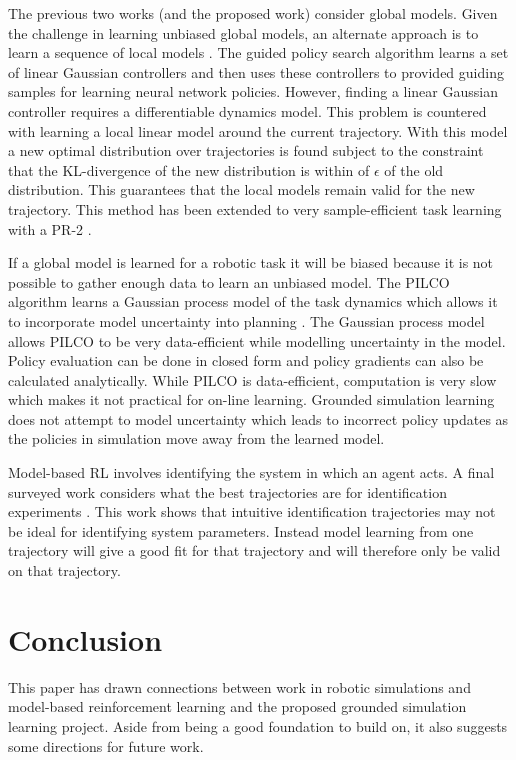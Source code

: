 \documentclass[12 pt]{article}
\begin{document}
The previous two works (and the proposed work) consider global models. Given the challenge in learning unbiased global models, an alternate approach is to learn a sequence of local models \cite{levine2014learning}. The guided policy search algorithm learns a set of linear Gaussian controllers and then uses these controllers to provided guiding samples for learning neural network policies. However, finding a linear Gaussian controller requires a differentiable dynamics model. This problem is countered with learning a local linear model around the current trajectory. With this model a new optimal  distribution over trajectories is found subject to the constraint that the KL-divergence of the new distribution is within of $\epsilon$ of the old distribution. This guarantees that the local models remain valid for the new trajectory. This method has been extended to very sample-efficient task learning with a PR-2 \cite{levine2015learning}. 

If a global model is learned for a robotic task it will be biased because it is not possible to gather enough data to learn an unbiased model. The PILCO algorithm learns a Gaussian process model of the task dynamics which allows it to incorporate model uncertainty into planning \cite{deisenroth2011pilco}. The Gaussian process model allows PILCO to be very data-efficient while modelling uncertainty in the model. Policy evaluation can be done in closed form and policy gradients can also be calculated analytically. While PILCO is data-efficient, computation is very slow which makes it not practical for on-line learning. Grounded simulation learning does not attempt to model uncertainty which leads to incorrect policy updates as the policies in simulation move away from the learned model.

Model-based RL involves identifying the system in which an agent acts. A final surveyed work considers what the best trajectories are for identification experiments \cite{armstrong1987find}. This work shows that intuitive identification trajectories may not be ideal for identifying system parameters. Instead model learning from one trajectory will give a good fit for that trajectory and will therefore only be valid on that trajectory.

\section{Conclusion}

This paper has drawn connections between work in robotic simulations and model-based reinforcement learning and the proposed grounded simulation learning project. Aside from being a good foundation to build on, it also suggests some directions for future work.



\end{document}
